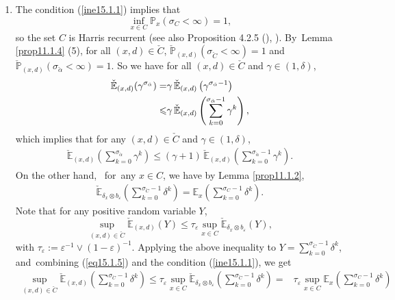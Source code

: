 \documentclass[11pt]{elsarticle}
\newcommand{\rmnum}[1]{\romannumeral #1}
\def\leq{\leqslant}
\def\P{\mathbb{P}}
\def\E{\mathbb{E}}
\begin{document}
\begin{pf}
	\begin{enumerate}
		\item [(1)] The condition (\ref{ine15.1.1}) implies that
		$$
		\inf_{x\in C}\P_x(\sigma_C<\infty)=1,
		$$
		so the set $C$ is Harris recurrent (see also {Proposition 4.2.5} (\rmnum{2}), \cite{DMPS18}). By~Lemma \ref{prop11.1.4} (5), for all $(x,d)\in\check{C}$, $\check{\P}_{(x,d)}(\sigma_{\check{C}}<\infty)=1$ and $\check{\P}_{(x,d)}(\sigma_{\check{\alpha}}<\infty)=1$. So we have for all $(x,d)\in \check{C}$ and $\gamma\in(1,\delta)$,
		\vspace{-3pt}
		\begin{align}
			\check{\E}_{(x,d)}(\gamma^{\sigma_{\check{\alpha}}})=&\gamma\,\check{\E}_{(x,d)}\left(\gamma^{\sigma_{\check{\alpha}}-1}\right)\notag\\
			\leq&\gamma\,\check{\E}_{(x,d)}\left(\sum_{k=0}^{\sigma_{\check{\alpha}}-1}\gamma^{k}\right)\label{ine15.1.4},
		\end{align}
		which implies that for any $(x,d)\in \check{C}$ and $\gamma\in(1,\delta)$,
		\begin{align}\label{ine15.1.4*}
			\check{\E}_{(x,d)}\left(\sum_{k=0}^{\sigma_{\check{\alpha}}}\gamma^{k}\right)\leq(\gamma+1)\,\check{\E}_{(x,d)}\left(\sum_{k=0}^{\sigma_{\check{\alpha}}-1}\gamma^{k}\right).
		\end{align}	
		On the other hand, %
		~for~any $x\in C$, we have by Lemma \ref{prop11.1.2},
		\begin{align}\label{eq15.1.5}
			\check{\E}_{\delta_x\otimes b_\varepsilon}\left(\sum_{k=0}^{\sigma_{\check{C}}-1}\delta^k\right)=\E_{x}\left(\sum_{k=0}^{\sigma_{C}-1}\delta^k\right).
		\end{align}
		Note that for any positive random variable $Y$,
		$$\sup_{(x,d)\in\check{C}}\check{\E}_{(x,d)}(Y)\leq\tau_\varepsilon\sup_{x\in C}\check{\E}_{\delta_x\otimes b_\varepsilon}(Y),$$
		with $\tau_\varepsilon:=\varepsilon^{-1}\vee(1-\varepsilon)^{-1}$. Applying the above inequality to $Y=\sum_{k=0}^{\sigma_{\check{C}}-1}\delta^k$, and~combining (\ref{eq15.1.5}) and the condition (\ref{ine15.1.1}), we get
		\begin{align}
			\sup_{(x,d)\in\check{C}}\check{\E}_{(x,d)}\left(\sum_{k=0}^{\sigma_{\check{C}}-1}\delta^k\right)\leq\tau_\varepsilon\sup_{x\in C}\check{\E}_{\delta_x\otimes b_\varepsilon}\left(\sum_{k=0}^{\sigma_{\check{C}}-1}\delta^k\right)=&\tau_\varepsilon\sup_{x\in C}\E_x\left(\sum_{k=0}^{\sigma_C-1}\delta^k\right)\label{eq15.0}\\

\end{align}
\end{enumerate}
\end{pf}
\end{document}
